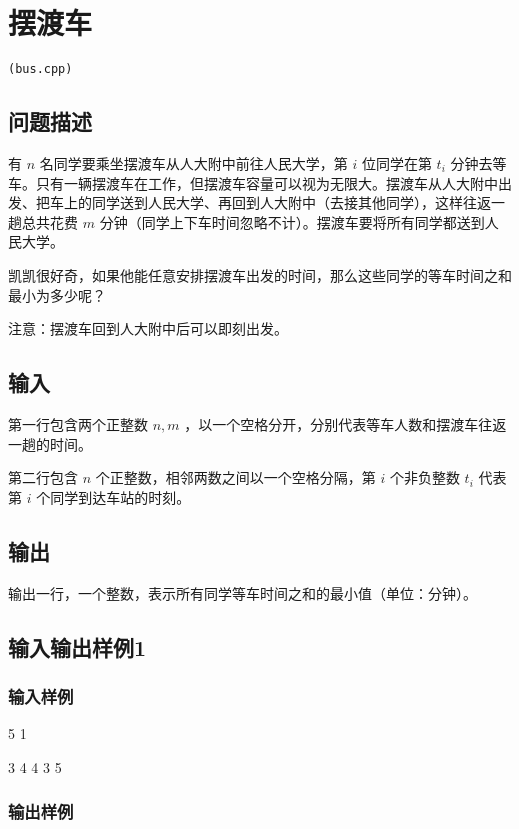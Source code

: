 \documentclass[UTF8]{ctexart}
\begin{document}
\newpage
\section{摆渡车}
\begin{center}
\tt\large{(bus.cpp)}
\end{center}
\subsection{问题描述}

有 $n$ 名同学要乘坐摆渡车从人大附中前往人民大学，第 $i$ 位同学在第 $t_i$ 分钟去等车。只有一辆摆渡车在工作，但摆渡车容量可以视为无限大。摆渡车从人大附中出发、把车上的同学送到人民大学、再回到人大附中（去接其他同学），这样往返一趟总共花费 $m$ 分钟（同学上下车时间忽略不计）。摆渡车要将所有同学都送到人民大学。

凯凯很好奇，如果他能任意安排摆渡车出发的时间，那么这些同学的等车时间之和最小为多少呢？

注意：摆渡车回到人大附中后可以即刻出发。

\subsection{输入}

第一行包含两个正整数 $n,m$ ，以一个空格分开，分别代表等车人数和摆渡车往返一趟的时间。

第二行包含 $n$ 个正整数，相邻两数之间以一个空格分隔，第 $i$ 个非负整数   $t_i$ 代表第 $i$ 个同学到达车站的时刻。

\subsection{输出}

输出一行，一个整数，表示所有同学等车时间之和的最小值（单位：分钟）。

\subsection{输入输出样例1}
\subsubsection{输入样例}

5 1 

3 4 4 3 5 

\subsubsection{输出样例}
\end{document}
